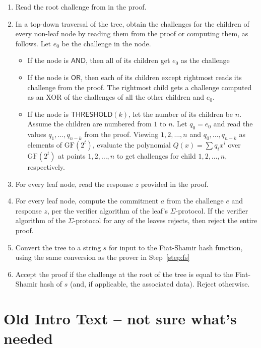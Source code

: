 \documentclass[11pt]{article}
\newcommand{\andnode}{\ensuremath{\mathsf{AND}}}
\newcommand{\ornode}{\ensuremath{\mathsf{OR}}}
\newcommand{\tnode}{\ensuremath{\mathsf{THRESHOLD}}}
\newcommand{\GF}{\ensuremath{\mathrm{GF}}}
\begin{document}
\begin{enumerate}
\item Read the root challenge from in the proof. 

\item In a top-down traversal of the tree, obtain the challenges for the children of every non-leaf node by reading them from the proof or computing them, as follows. Let $e_0$ be the challenge in the node. 
        \begin{itemize}
            \item If the node is $\andnode$,  then all of its children get $e_0$ as the challenge
            \item If the node is $\ornode$, then each of its children except rightmost reads its challenge from the proof. The rightmost child gets a challenge computed as an XOR of the challenges of all the other children and $e_0$.
            \item If the node is $\tnode(k)$, let the number of its children be $n$. Assume the children are numbered from $1$ to $n$. Let $q_0=e_0$ and read the values $q_1, \dots, q_{n-k}$ from the proof. Viewing $1, 2, \dots, n$ and $q_0, \dots, q_{n-k}$ as elements of $\GF(2^t)$, evaluate the polynomial $Q(x) = \sum {q_i x^i}$ over $\GF(2^t)$ at points $1, 2, \dots, n$ to get challenges for child $1, 2, \dots, n$, respectively. 
        \end{itemize}
        
 \item For every leaf node, read the response $z$ provided in the proof.

\item For every leaf node, compute the commitment $a$ from the challenge $e$ and response $z$, per the verifier algorithm of the leaf's $\Sigma$-protocol. If the verifier algorithm of the $\Sigma$-protocol for any of the leaves rejects, then reject the entire proof.

\item Convert the tree to a string $s$ for input to the Fiat-Shamir hash function, using the same conversion as the prover in Step~\ref{step:fs}

\item Accept the proof if the challenge at the root of the tree is equal to the Fiat-Shamir hash of $s$ (and, if applicable,  the associated data). Reject otherwise.
\end{enumerate}


\section{Old Intro Text -- not sure what's needed}
\end{document}
